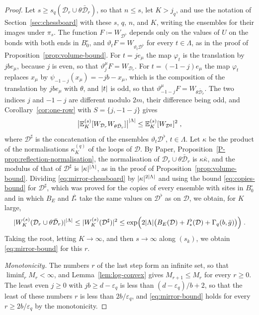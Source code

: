\documentclass[11pt]{preprint}
\DeclarePairedDelimiter{\abs}{\lvert}{\rvert}
\numberwithin{equation}{section}
\theoremstyle{definition}
\theoremstyle{remark}
\theoremstyle{plain}
\begin{document}
\begin{proof}
Let $s \geq s_q(\mathcal D_r \cup \theta\bar{\mathcal D}_r)$, so that $n \leq s$, let $K > j_q$, and use the notation of Section~\ref{sec:chessboard} with these $s$, $q$, $n$, and $K$, writing the ensembles for their images under $\pi_s$. The function $F \coloneqq W_{\mathcal D^\flat}$ depends only on the values of $U$ on the bonds with both ends in $B^\circ_0$, and $\vartheta_tF = W_{\vartheta_t\mathcal D^\flat}$ for every $t \in \Lambda$, as in the proof of Proposition~\ref{prop:volume-bound}. For $t = je_\mu$ the map $\varphi_t$ is the translation by $jbe_\mu$, because $j$ is even, so that $\vartheta^\mu_jF = W_{\mathcal D_r}$. For $t = (-1 - j)e_\mu$ the map $\varphi_t$ replaces $x_\mu$ by $\psi_{-1-j}(x_\mu) = -jb - x_\mu$, which is the composition of the translation by $jbe_\mu$ with $\theta$, and $\abs{t}$ is odd, so that $\vartheta^\mu_{-1-j}F = W_{\theta\bar{\mathcal D}_r}$. The two indices $j$ and $-1 - j$ are different modulo $2m$, their difference being odd, and Corollary~\ref{cor:one-row} with $S = \{ j, -1 - j \}$ gives
\begin{equation}\label{eq:mirror-chessboard}
    \bigl\lvert\mathbb E^{(s)}_K[W_{\mathcal D_r}W_{\theta\bar{\mathcal D}_r}]\bigr\rvert^{\abs{\Lambda}} \leq \mathbb E^{(s)}_K[W_{\mathcal D^\sharp}]^2\;,
\end{equation}
where $\mathcal D^\sharp$ is the concatenation of the ensembles $\vartheta_t\mathcal D^\flat$, $t \in \Lambda$. Let $\kappa$ be the product of the normalisations $\kappa^{(q)}_K$ of the loops of $\mathcal D$. By Paper, Proposition~\ref{P-prop:reflection-normalisation}, the normalisation of $\mathcal D_r \cup \theta\bar{\mathcal D}_r$ is $\kappa\bar\kappa$, and the modulus of that of $\mathcal D^\sharp$ is $\abs{\kappa}^{\abs{\Lambda}}$, as in the proof of Proposition~\ref{prop:volume-bound}. Dividing \eqref{eq:mirror-chessboard} by $\abs{\kappa}^{2\abs{\Lambda}}$ and using the bound \eqref{eq:copies-bound} for $\mathcal D^\sharp$, which was proved for the copies of every ensemble with sites in $B^\circ_0$ and in which $B_E$ and $I^\flat_*$ take the same values on $\mathcal D^\flat$ as on $\mathcal D$, we obtain, for $K$ large,
\begin{equation}\label{eq:mirror-torus}
    \abs{W^{(s)}_K(\mathcal D_r \cup \theta\bar{\mathcal D}_r)}^{\abs{\Lambda}} \leq \abs{W^{(s)}_K(\mathcal D^\sharp)}^2 \leq \exp\Bigl(2\abs{\Lambda}\bigl(B_E(\mathcal D) + I^\flat_*(\mathcal D) + \Gamma_q(b, \bar g)\bigr)\Bigr)\;.
\end{equation}
Taking the root, letting $K \to \infty$, and then $s \to \infty$ along $(s_k)$, we obtain \eqref{eq:mirror-bound} for this $r$.

\emph{Monotonicity.} The numbers $r$ of the last step form an infinite set, so that $\liminf_rM_r < \infty$, and Lemma~\ref{lem:log-convex} gives $M_{r+1} \leq M_r$ for every $r \geq 0$. The least even $j \geq 0$ with $jb \geq d - \varepsilon_q$ is less than $(d - \varepsilon_q)/b + 2$, so that the least of these numbers $r$ is less than $2b/\varepsilon_q$, and \eqref{eq:mirror-bound} holds for every $r \geq 2b/\varepsilon_q$ by the monotonicity.
\end{proof}
\end{document}
